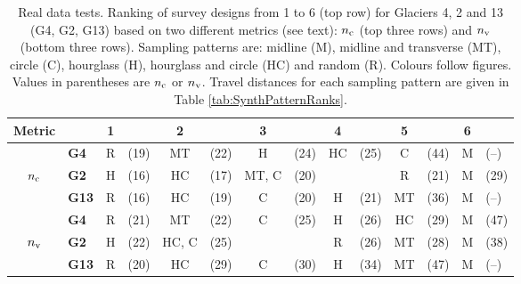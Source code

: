 \documentclass[twocolumn,letterpaper]{igs}
\begin{document}
\begin{table}[]
\centering
\caption{Real data tests. Ranking of survey designs from 1 to 6 (top row) for Glaciers 4, 2 and 13 (G4, G2, G13) based on two different metrics (see text): $n_{\rm c}$ (top three rows) and $n_{\rm v}$ (bottom three rows). Sampling patterns are: midline (M), midline and transverse (MT), circle (C), hourglass (H), hourglass and circle (HC) and random (R). Colours follow figures. Values in parentheses are $n_{\rm c}$ or $n_{\rm v}$. Travel distances for each sampling pattern are given in Table \ref{tab:SynthPatternRanks}.}
\label{tab:RealPatternRanks}
\begin{tabular}{clclclclclclcl}
\hline
 Metric         && \textbf{1} && \textbf{2} && \textbf{3} && \textbf{4} && \textbf{5} && \textbf{6} \\
 \hline
                & \textbf{G4}   & \textcolor{R}{R}         & (19) & \textcolor{MT}{MT}         & (22)         &  \textcolor{H}{H}        &  (24)        & \textcolor{HC}{HC}         & (25)           &  \textcolor{C}{C}        & (44) & \textcolor{M}{M} & (--) \\
$n_{\rm c}$         & \textbf{G2}   & \textcolor{H}{H}         & (16)         &  \textcolor{HC}{HC}        &  (17)          & \textcolor{MT}{MT}, \textcolor{C}{C}        & (20)         &          &          & \textcolor{R}{R}         & (21) & \textcolor{M}{M} & (29) \\
                & \textbf{G13} & \textcolor{R}{R}         & (16)         & \textcolor{HC}{HC} & (19)         & \textcolor{C}{C}                 & (20)         &           \textcolor{H}{H}        &   (21)        & \textcolor{MT}{MT}         & (36) & \textcolor{M}{M} & (--) \\
\hline
                & \textbf{G4}   & \textcolor{R}{R}         & (21)         &   \textcolor{MT}{MT}        &  (22)         & \textcolor{C}{C}         & (25)         & \textcolor{H}{H}                 & (26)         & \textcolor{HC}{HC} & (29) & \textcolor{M}{M} & (47) \\
$n_{\rm v}$         & \textbf{G2}   & \textcolor{H}{H}         & (22)         & \textcolor{HC}{HC}, \textcolor{C}{C}         & (25)         &            &         &  \textcolor{R}{R}                & (26)        &  \textcolor{MT}{MT}         & (28) & \textcolor{M}{M} & (38) \\
                & \textbf{G13} & \textcolor{R}{R}         & (20)         & \textcolor{HC}{HC}         & (29)         & \textcolor{C}{C}                 & (30)         &  \textcolor{H}{H}        & (34)         & \textcolor{MT}{MT}         & (47) & \textcolor{M}{M} & (--) \\

\end{tabular}
\end{table}
\end{document}
